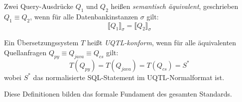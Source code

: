 \begin{definition}
\label{def:sem_aequiv}
Zwei Query-Ausdrücke $Q_1$ und $Q_2$ heißen \emph{semantisch äquivalent},
geschrieben $Q_1 \equiv Q_2$, wenn für alle Datenbankinstanzen $\sigma$ gilt:
\[
  \llbracket Q_1 \rrbracket_\sigma = \llbracket Q_2 \rrbracket_\sigma
\]
\end{definition}

\begin{definition}
\label{def:konformitaet}
Ein Übersetzungssystem $T$ heißt \emph{UQTL-konform}, wenn für alle
äquivalenten Quellanfragen $Q_{py} \equiv Q_{java} \equiv Q_{cs}$ gilt:
\[
  T(Q_{py}) = T(Q_{java}) = T(Q_{cs}) = S^*
\]
wobei $S^*$ das normalisierte SQL-Statement im UQTL-Normalformat ist.
\end{definition}

Diese Definitionen bilden das formale Fundament des gesamten Standards.

